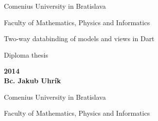 \documentclass[oneside, 12pt]{book}
\author{\mfauthor}
\title{\mftitle}
\def\mftitle{Two-way databinding of models and views in Dart}          %
\def\mfthesistype{Diploma thesis}             %
\def\mfauthor{Bc. Jakub Uhrík}                            %
\def\mfdate{2014}                                         %
\def\mfuniversity{Comenius University in Bratislava}      %
\def\mffakulta{Faculty of Mathematics, Physics and Informatics}  %
\renewcommand\baselinestretch{1.3}
\begin{document}
\frontmatter

\thispagestyle{empty}

\noindent
\begin{center}
\begin{minipage}{0.8\textwidth}
\centerline{\renewcommand\baselinestretch{1.3} \LARGE\sc\mfuniversity}
\centerline{\sc\mffakulta}
\end{minipage}
\end{center}

\vfill
\begin{center}
\begin{minipage}{1\textwidth}
\bigskip\bigskip
\begin{center}
\linespread{1}\LARGE\sc\mftitle
\end{center}
\smallskip
\centerline{\mfthesistype}
\bigskip
\bigskip
\bigskip\bigskip
\end{minipage}
\end{center}
\vfill
{\bf\mfdate\\
\indent\mfauthor}
\eject 




\thispagestyle{empty}

\noindent
\begin{center}
\begin{minipage}{0.8\textwidth}
\centerline{\LARGE\sc\mfuniversity}
\centerline{\sc\mffakulta}
\end{minipage}
\end{center}
\end{document}
